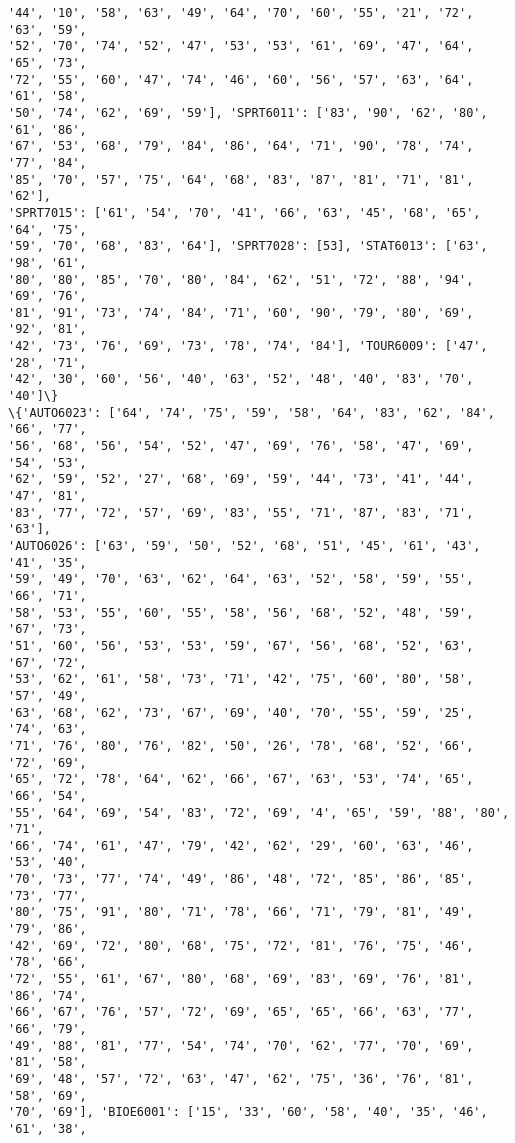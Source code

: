 \documentclass[11pt]{article}
\begin{document}
\begin{Verbatim}[commandchars=\\\{\}]
'44', '10', '58', '63', '49', '64', '70', '60', '55', '21', '72', '63', '59',
'52', '70', '74', '52', '47', '53', '53', '61', '69', '47', '64', '65', '73',
'72', '55', '60', '47', '74', '46', '60', '56', '57', '63', '64', '61', '58',
'50', '74', '62', '69', '59'], 'SPRT6011': ['83', '90', '62', '80', '61', '86',
'67', '53', '68', '79', '84', '86', '64', '71', '90', '78', '74', '77', '84',
'85', '70', '57', '75', '64', '68', '83', '87', '81', '71', '81', '62'],
'SPRT7015': ['61', '54', '70', '41', '66', '63', '45', '68', '65', '64', '75',
'59', '70', '68', '83', '64'], 'SPRT7028': [53], 'STAT6013': ['63', '98', '61',
'80', '80', '85', '70', '80', '84', '62', '51', '72', '88', '94', '69', '76',
'81', '91', '73', '74', '84', '71', '60', '90', '79', '80', '69', '92', '81',
'42', '73', '76', '69', '73', '78', '74', '84'], 'TOUR6009': ['47', '28', '71',
'42', '30', '60', '56', '40', '63', '52', '48', '40', '83', '70', '40']\}
\{'AUTO6023': ['64', '74', '75', '59', '58', '64', '83', '62', '84', '66', '77',
'56', '68', '56', '54', '52', '47', '69', '76', '58', '47', '69', '54', '53',
'62', '59', '52', '27', '68', '69', '59', '44', '73', '41', '44', '47', '81',
'83', '77', '72', '57', '69', '83', '55', '71', '87', '83', '71', '63'],
'AUTO6026': ['63', '59', '50', '52', '68', '51', '45', '61', '43', '41', '35',
'59', '49', '70', '63', '62', '64', '63', '52', '58', '59', '55', '66', '71',
'58', '53', '55', '60', '55', '58', '56', '68', '52', '48', '59', '67', '73',
'51', '60', '56', '53', '53', '59', '67', '56', '68', '52', '63', '67', '72',
'53', '62', '61', '58', '73', '71', '42', '75', '60', '80', '58', '57', '49',
'63', '68', '62', '73', '67', '69', '40', '70', '55', '59', '25', '74', '63',
'71', '76', '80', '76', '82', '50', '26', '78', '68', '52', '66', '72', '69',
'65', '72', '78', '64', '62', '66', '67', '63', '53', '74', '65', '66', '54',
'55', '64', '69', '54', '83', '72', '69', '4', '65', '59', '88', '80', '71',
'66', '74', '61', '47', '79', '42', '62', '29', '60', '63', '46', '53', '40',
'70', '73', '77', '74', '49', '86', '48', '72', '85', '86', '85', '73', '77',
'80', '75', '91', '80', '71', '78', '66', '71', '79', '81', '49', '79', '86',
'42', '69', '72', '80', '68', '75', '72', '81', '76', '75', '46', '78', '66',
'72', '55', '61', '67', '80', '68', '69', '83', '69', '76', '81', '86', '74',
'66', '67', '76', '57', '72', '69', '65', '65', '66', '63', '77', '66', '79',
'49', '88', '81', '77', '54', '74', '70', '62', '77', '70', '69', '81', '58',
'69', '48', '57', '72', '63', '47', '62', '75', '36', '76', '81', '58', '69',
'70', '69'], 'BIOE6001': ['15', '33', '60', '58', '40', '35', '46', '61', '38',

\end{Verbatim}
\end{document}
